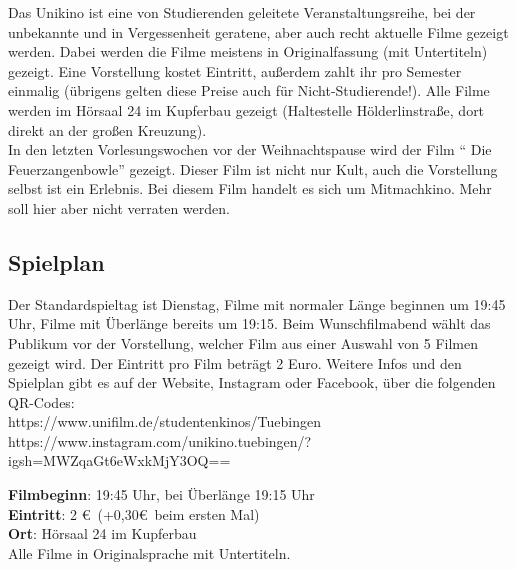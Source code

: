 Das Unikino ist eine von Studierenden geleitete Veranstaltungsreihe, bei der
unbekannte und in Vergessenheit geratene, aber auch recht aktuelle Filme
gezeigt werden. Dabei werden die Filme meistens in Originalfassung (mit
Untertiteln) gezeigt. Eine Vorstellung kostet  Eintritt, außerdem zahlt
ihr pro Semester einmalig  (übrigens gelten diese Preise auch für
Nicht-Studierende!). Alle Filme werden im Hörsaal 24 im Kupferbau gezeigt
(Haltestelle Hölderlinstraße, dort direkt an der großen Kreuzung).\\ 
In den letzten Vorlesungswochen vor der Weihnachtspause wird der Film 
"` Die Feu\-er\-zang\-en\-bow\-le"' gezeigt. Dieser Film ist nicht nur Kult,
auch die Vorstellung selbst ist ein Erlebnis. Bei diesem Film handelt es sich 
um Mitmachkino. Mehr soll hier aber nicht verraten werden.


\vspace*{-1em}

\subsection*{Spielplan}
Der Standardspieltag ist Dienstag, Filme mit normaler Länge beginnen um 19:45
Uhr, Filme mit Überlänge bereits um 19:15. Beim Wunschfilmabend wählt das
Publikum vor der Vorstellung, welcher Film aus einer Auswahl von 5 Filmen
gezeigt wird. Der Eintritt pro Film beträgt 2 Euro. Weitere Infos und den Spielplan gibt es auf der Website, 
Instagram oder Facebook, über die folgenden QR-Codes:
\\

\scriptsize{https://www.unifilm.de/studentenkinos/Tuebingen}
\\
\scriptsize{https://www.instagram.com/unikino.tuebingen/?igsh=MWZqaGt6eWxkMjY3OQ==}



\textbf{Filmbeginn}: 19:45 Uhr, bei Überlänge 19:15 Uhr\\
\textbf{Eintritt}: 2 \euro ~(+0,30\euro \ beim ersten Mal)\\
\textbf{Ort}: Hörsaal 24 im Kupferbau\\
Alle Filme in Originalsprache mit Untertiteln.


